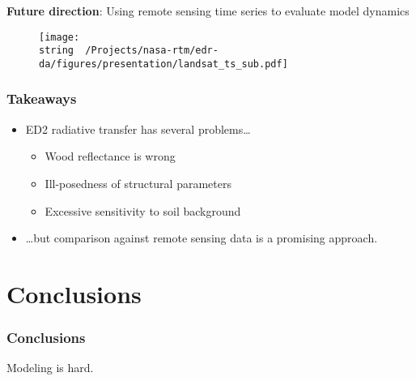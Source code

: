 \documentclass{beamer}
\begin{document}
\begin{frame}{\textbf{Future direction}: Using remote sensing time series to evaluate model dynamics}
  \begin{figure}
    \centering
    \texttt{[image: \\string ~/Projects/nasa-rtm/edr-da/figures/presentation/landsat\_ts\_sub.pdf]}
  \end{figure}
\end{frame}

\begin{frame} \frametitle{Takeaways}
  \begin{itemize}
  \item ED2 radiative transfer has several problems\ldots
    \begin{itemize}
    \item Wood reflectance is wrong
    \item Ill-posedness of structural parameters
    \item Excessive sensitivity to soil background
    \end{itemize}
  \item \ldots but comparison against remote sensing data is a promising approach.
  \end{itemize}
\end{frame}

\section{Conclusions}

\begin{frame} \frametitle{Conclusions}
  Modeling is hard.
\end{frame}
\end{document}
